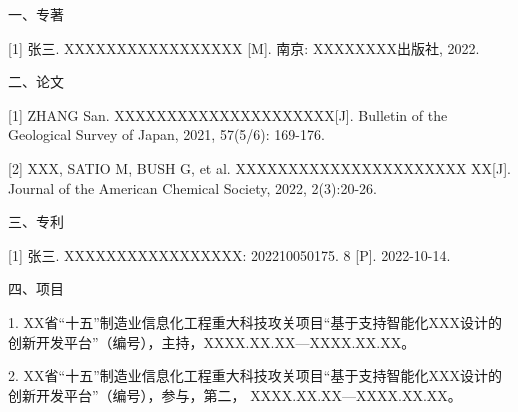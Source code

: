 \begin{publications}

{\heiti 一、专著}

[1] 张三. XXXXXXXXXXXXXXXXX [M]. 南京: XXXXXXXX出版社, 2022.


{\heiti 二、论文}

[1] ZHANG San. XXXXXXXXXXXXXXXXXXXXX[J]. Bulletin of the Geological Survey of Japan, 2021, 57(5/6): 169-176.

[2] XXX, SATIO M, BUSH G, et al. XXXXXXXXXXXXXXXXXXXXXX XX[J]. Journal of the American Chemical Society, 2022, 2(3):20-26.


{\heiti 三、专利}

[1] 张三. XXXXXXXXXXXXXXXXX: 202210050175. 8 [P]. 2022-10-14.


{\heiti 四、项目}

1. XX省“十五”制造业信息化工程重大科技攻关项目“基于支持智能化XXX设计的创新开发平台”（编号），主持，XXXX.XX.XX—XXXX.XX.XX。

2. XX省“十五”制造业信息化工程重大科技攻关项目“基于支持智能化XXX设计的创新开发平台”（编号），参与，第二， XXXX.XX.XX—XXXX.XX.XX。


\end{publications}
